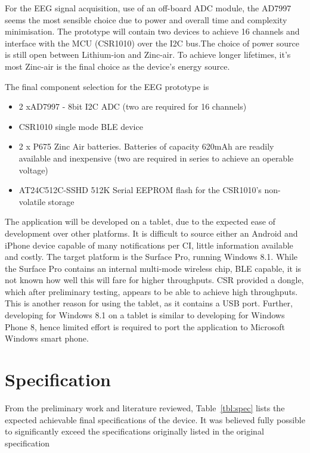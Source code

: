 \documentclass[]{article}
\begin{document}
For the \ac{EEG} signal acquisition, use of an off-board \ac{ADC} module, the AD7997 seems the most sensible choice due to power and overall time and complexity minimisation. The prototype will contain two devices to achieve 16 channels and interface with the \ac{MCU} (CSR1010) over the I2C bus.The choice of power source is still open between Lithium-ion and Zinc-air. To achieve longer lifetimes, it's most Zinc-air is the final choice as the device's energy source.

The final component selection for the \ac{EEG} prototype is
\begin{itemize}
\item 2 xAD7997 - 8bit I2C ADC (two are required for 16 channels)
\item CSR1010 single mode BLE device
\item 2 x P675 Zinc Air batteries. Batteries of capacity 620mAh are readily available and inexpensive (two are required in series to achieve an operable voltage)
\item AT24C512C-SSHD 512K Serial EEPROM flash for the CSR1010's non-volatile storage
\end{itemize}

The application will be developed on a tablet, due to the expected ease of development over other platforms. It is difficult to source either an Android and iPhone device capable of many notifications per \ac{CI}, little information available and costly. The target platform is the Surface Pro, running Windows 8.1. While the Surface Pro contains an internal multi-mode wireless chip, \ac{BLE} capable, it is not known how well this will fare for higher throughputs. \ac{CSR} provided a dongle, which after preliminary testing, appears to be able to achieve high throughputs. This is another reason for using the tablet, as it contains a \ac{USB} port. Further, developing for Windows 8.1 on a tablet is similar to developing for Windows Phone 8, hence limited effort is required to port the application to Microsoft Windows smart phone.


\clearpage
\section{Specification}

From the preliminary work and literature reviewed, Table~\ref{tbl:spec} lists the expected achievable final specifications of the device. It was believed fully possible to significantly exceed the specifications originally listed in the original specification 
\end{document}

